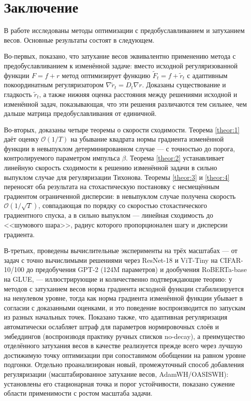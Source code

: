 \section{Заключение}

В работе исследованы методы оптимизации с предобуславливанием и затуханием весов. Основные результаты состоят в следующем.

Во-первых, показано, что затухание весов эквивалентно применению метода с предобуславливанием к изменённой задаче: вместо исходной регуляризованной функции $F = f + r$ метод оптимизирует функцию $\widetilde{F}_t = f + \widetilde{r}_t$ с адаптивным покоординатным регуляризатором $\nabla \widetilde{r}_t = D_t \nabla r$. Доказаны существование и гладкость $\widetilde{r}_t$, а также нижняя оценка расстояния между решениями исходной и изменённой задач, показывающая, что эти решения различаются тем сильнее, чем дальше матрица предобуславливания от единичной.

Во-вторых, доказаны четыре теоремы о скорости сходимости. Теорема \ref{theor:1} даёт оценку $\mathcal{O}(1/T)$ на убывание квадрата нормы градиента изменённой функции в невыпуклом детерминированном случае --- с точностью до порога, контролируемого параметром импульса $\beta$. Теорема \ref{theor:2} устанавливает линейную скорость сходимости к решению изменённой задачи в сильно выпуклом случае для регуляризации Тихонова. Теоремы \ref{theor:3} и \ref{theor:4} переносят оба результата на стохастическую постановку с несмещённым градиентом ограниченной дисперсии: в невыпуклом случае получена скорость $\mathcal{O}(1/\sqrt{T})$, совпадающая по порядку со скоростью стохастического градиентного спуска, а в сильно выпуклом --- линейная сходимость до <<шумового шара>>, радиус которого пропорционален шагу и дисперсии градиента.

В-третьих, проведены вычислительные эксперименты на трёх масштабах --- от задач с точно вычислимыми решениями через ResNet-18 и ViT-Tiny на CIFAR-10/100 до предобучения GPT-2 (124M параметров) и дообучения RoBERTa-base на GLUE, --- иллюстрирующие и количественно подтверждающие теорию: у методов с затуханием весов норма градиента исходной функции стабилизируется на ненулевом уровне, тогда как норма градиента изменённой функции убывает в согласии с доказанными оценками, и это поведение воспроизводится по запускам из разных начальных точек. Показано также, что адаптивная регуляризация автоматически ослабляет штраф для параметров нормировочных слоёв и эмбеддингов (воспроизводя практику ручных списков no-decay), а преимущество отделённого затухания весов в качестве реализуется прежде всего через лучшую достижимую точку оптимизации при сопоставимом обобщении на равном уровне подгонки. Отдельно проанализирован новый, промежуточный способ добавления регуляризации (масштабированное затухание весов, AdamWH/OASISWH): установлены его стационарная точка и порог устойчивости, показано сужение области применимости с ростом масштаба задачи.

